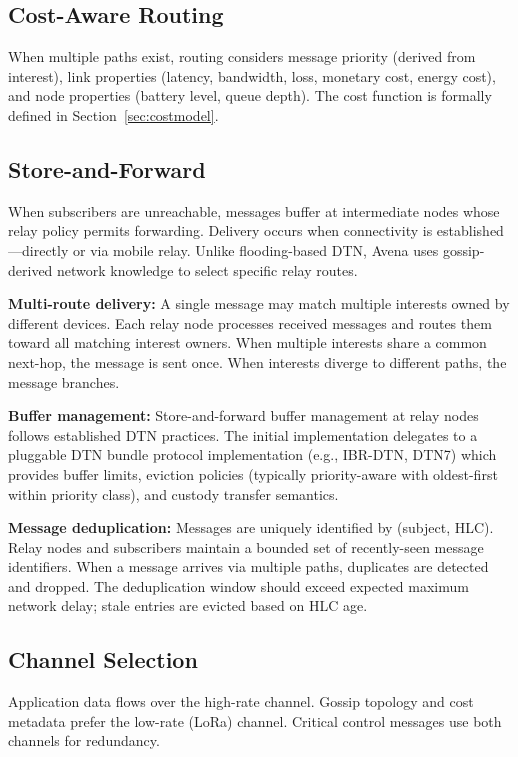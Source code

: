 \subsection{Cost-Aware Routing}

When multiple paths exist, routing considers message priority (derived from interest), link properties (latency, bandwidth, loss, monetary cost, energy cost), and node properties (battery level, queue depth). The cost function is formally defined in Section~\ref{sec:costmodel}.

\subsection{Store-and-Forward}

When subscribers are unreachable, messages buffer at intermediate nodes whose relay policy permits forwarding. Delivery occurs when connectivity is established---directly or via mobile relay. Unlike flooding-based DTN, Avena uses gossip-derived network knowledge to select specific relay routes.

\textbf{Multi-route delivery:} A single message may match multiple interests owned by different devices. Each relay node processes received messages and routes them toward all matching interest owners. When multiple interests share a common next-hop, the message is sent once. When interests diverge to different paths, the message branches.

\textbf{Buffer management:} Store-and-forward buffer management at relay nodes follows established DTN practices. The initial implementation delegates to a pluggable DTN bundle protocol implementation (e.g., IBR-DTN, DTN7) which provides buffer limits, eviction policies (typically priority-aware with oldest-first within priority class), and custody transfer semantics.

\textbf{Message deduplication:} Messages are uniquely identified by (subject, HLC). Relay nodes and subscribers maintain a bounded set of recently-seen message identifiers. When a message arrives via multiple paths, duplicates are detected and dropped. The deduplication window should exceed expected maximum network delay; stale entries are evicted based on HLC age.

\subsection{Channel Selection}

Application data flows over the high-rate channel. Gossip topology and cost metadata prefer the low-rate (LoRa) channel. Critical control messages use both channels for redundancy.

